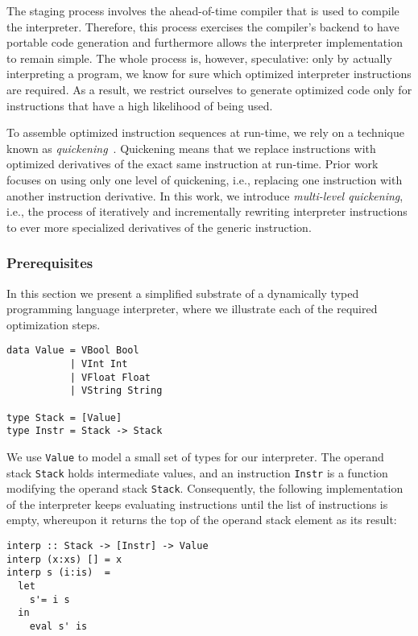 \documentclass[preprint,10pt]{popl14conf}
\begin{document}
The staging process involves the ahead-of-time compiler that is used to compile the interpreter.
Therefore, this process exercises the compiler's backend to have portable code generation and
furthermore allows the interpreter implementation to remain simple.
The whole process is, however, speculative:
only by actually interpreting a program, we know for sure which optimized interpreter instructions
are required.
As a result, we restrict ourselves to generate optimized code only for instructions that have a high
likelihood of being used.

To assemble optimized instruction sequences at run-time, we rely on a technique known as
\emph{quickening}~\cite{lindholm.yellin+96}.
Quickening means that we replace instructions with optimized derivatives of the exact same
instruction at run-time.
Prior work focuses on using only one level of quickening, i.e., replacing one instruction with
another instruction derivative.
In this work, we introduce \emph{multi-level quickening}, i.e., the process of iteratively and
incrementally rewriting interpreter instructions to ever more specialized derivatives of the generic
instruction.

\subsubsection{Prerequisites}

In this section we present a simplified substrate of a dynamically typed programming language
interpreter, where we illustrate each of the required optimization steps.
\begin{lstlisting}[style=prettyhaskell]
data Value = VBool Bool
           | VInt Int
           | VFloat Float
           | VString String

type Stack = [Value]
type Instr = Stack -> Stack
\end{lstlisting}

We use \texttt{Value} to model a small set of types for our interpreter.
The operand stack \texttt{Stack} holds intermediate values, and an instruction \texttt{Instr} is a
function modifying the operand stack \texttt{Stack}.
Consequently, the following implementation of the interpreter keeps evaluating instructions until
the list of instructions is empty, whereupon it returns the top of the operand stack element as its
result:
\begin{lstlisting}[style=prettyhaskell]
interp :: Stack -> [Instr] -> Value
interp (x:xs) [] = x
interp s (i:is)  =
  let
    s'= i s
  in
    eval s' is
\end{lstlisting}
\end{document}

